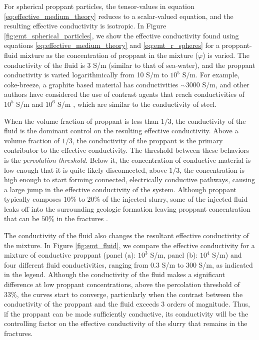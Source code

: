 For spherical proppant particles, the tensor-values in equation \ref{eq:effective_medium_theory} reduces to a scalar-valued equation, and the resulting effective conductivity is isotropic. In Figure \ref{fig:emt_spherical_particles}, we show the effective conductivity found using equations \ref{eq:effective_medium_theory} and \ref{eq:emt_r_spheres} for a proppant-fluid mixture as the concentration of proppant in the mixture ($\varphi$) is varied. The conductivity of the fluid is 3 S/m (similar to that of sea-water), and the proppant conductivity is varied logarithmically from 10 S/m to $10^5$ S/m. For example, coke-breeze, a graphite based material has conductivities $\sim 3000$ S/m, and other authors have considered the use of contrast agents that reach conductivities of $10^5$ S/m \cite{Weiss2015} and $10^6$ S/m \cite{Pardo2013}, which are similar to the conductivity of steel.




When the volume fraction of proppant is less than $1/3$, the conductivity of the fluid is the dominant control on the resulting effective conductivity. Above a volume  fraction of $1/3$, the conductivity of the proppant is the primary contributor to the effective conductivity. The threshold between these behaviors is the \emph{percolation threshold}. Below it, the concentration of conductive material is low enough that it is quite likely disconnected, above $1/3$, the concentration is high enough to start forming connected, electrically conductive pathways, causing a large jump in the effective conductivity of the system. Although proppant typically composes $10\%$ to $20\%$ of the injected slurry, some of the injected fluid leaks off into the surrounding geologic formation leaving proppant concentration that can be $50\%$ in the fractures \cite{Novotny1977, Hoversten2015}.

The conductivity of the fluid also changes the resultant effective conductivity of the mixture. In Figure \ref{fig:emt_fluid}, we compare the effective conductivity for a mixture of conductive proppant (panel (a): $10^3$ S/m, panel (b): $10^4$ S/m) and four different fluid conductivities, ranging from 0.3 S/m to 300 S/m, as indicated in the legend. Although the conductivity of the fluid makes a significant difference at low proppant concentrations, above the percolation threshold of 33\%, the curves start to converge, particularly when the contrast between the conductivity of the proppant and the fluid exceeds 3 orders of magnitude. Thus, if the proppant can be made sufficiently conductive, its conductivity will be the controlling factor on the effective conductivity of the slurry that remains in the fractures.


